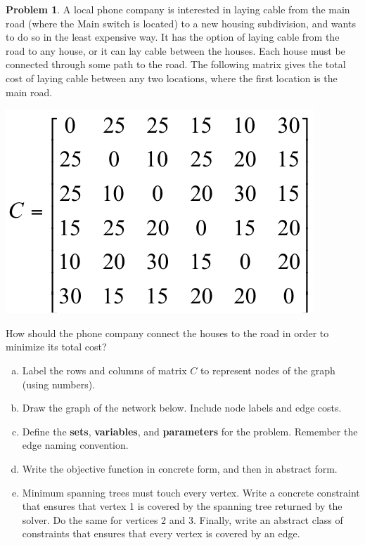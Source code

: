 \documentclass[11pt]{article}
\theoremstyle{definition}
\newtheorem{problem}{Problem}
\newcommand{\answerbox}[3]{%
  \fbox{%
    \begin{minipage}[#1]{#2}
      \hfill\vspace{#3}
    \end{minipage}
  }
}
\newcommand{\answerboxone}[2]{%
  \answerbox{#1}{6.0in}{#2} 
}
\begin{document}
\begin{problem}
A local phone company is interested in laying cable from the main road (where the
Main switch is located) to a new housing subdivision, and wants to do so in the least
expensive way.  It has the option of laying cable from the road to any house, or it can 
lay cable between the houses.  Each house must be connected through some path to 
the road.  The following matrix gives the total cost of laying cable between any two
locations, where the first location is the main road.

\begin{center}
\includegraphics[width = .3\textwidth]{costs}
\end{center}

How should the phone company connect the houses to the road in order to minimize its
total cost?

\begin{enumerate}[(a)]
\item Label the rows and columns of matrix $C$ to represent nodes of the graph (using numbers). 
\item Draw the graph of the network below.  Include node labels and edge costs.

\answerboxone{c}{10cm}

\newpage
\item Define the \textbf{sets}, \textbf{variables}, and \textbf{parameters} for the problem.  Remember the edge naming convention.

\answerboxone{c}{8cm}

\item Write the objective function in concrete form, and then in abstract form.

\answerboxone{c}{8cm}

\newpage
\item Minimum spanning trees must touch every vertex.  Write a concrete constraint that ensures that vertex 1 is covered by the spanning tree returned by the solver.  Do the same for vertices 2 and 3.  Finally, write an abstract class of constraints that ensures that every vertex is covered by an edge.

\answerboxone{c}{8cm}


\end{enumerate}
\end{problem}
\end{document}
